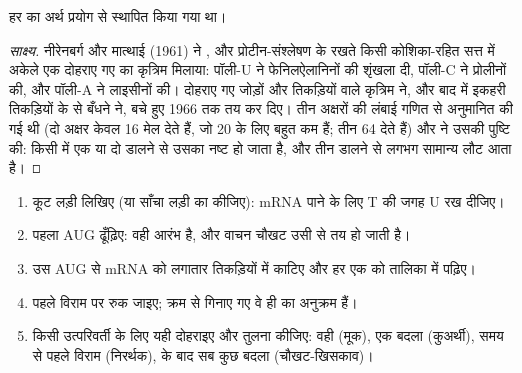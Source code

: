 \begin{proposition}[कूट पढ़ा कैसे गया]\label{prop:g11:gene-expression:readcode}
हर  का अर्थ प्रयोग से स्थापित किया गया था।
\end{proposition}
\begin{proof}[साक्ष्य]
नीरेनबर्ग और मात्थाई (1961) ने ,  और प्रोटीन-संश्लेषण
के  रखते किसी कोशिका-रहित सत्त में अकेले एक दोहराए गए
 का कृत्रिम  मिलाया: पॉली-U ने फेनिलऐलानिनों की शृंखला
दी, पॉली-C ने प्रोलीनों की, और पॉली-A ने लाइसीनों की। दोहराए गए जोड़ों और
तिकड़ियों वाले कृत्रिम  ने, और बाद में इकहरी तिकड़ियों के  से
बँधने ने, बचे हुए  1966 तक तय कर दिए। तीन अक्षरों की लंबाई गणित से
अनुमानित की गई थी (दो अक्षर केवल 16 मेल देते हैं, जो 20  के
लिए बहुत कम हैं; तीन 64 देते हैं) और  ने उसकी पुष्टि की: किसी
 में एक या दो  डालने से उसका  नष्ट हो जाता है, और
तीन डालने से लगभग सामान्य  लौट आता है।
\end{proof}

\begin{method}[किसी अनुक्रम का अनुवादन]\label{met:g11:gene-expression:translate}
\begin{enumerate}
  \item कूट लड़ी लिखिए (या साँचा लड़ी का  कीजिए): mRNA पाने के लिए
        T की जगह U रख दीजिए।
  \item पहला AUG ढूँढ़िए: वही आरंभ है, और वाचन चौखट उसी से तय हो जाती है।
  \item उस AUG से mRNA को लगातार तिकड़ियों में काटिए और हर एक को तालिका
        में पढ़िए।
  \item पहले विराम  पर रुक जाइए; क्रम से गिनाए गए वे  ही
         का अनुक्रम हैं।
  \item किसी उत्परिवर्ती के लिए यही दोहराइए और तुलना कीजिए: वही 
        (मूक), एक  बदला (कुअर्थी), समय से पहले विराम (निरर्थक),
         के बाद सब कुछ बदला (चौखट-खिसकाव)।
\end{enumerate}
\end{method}

